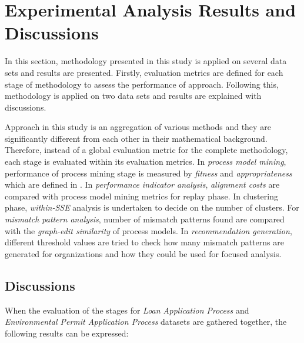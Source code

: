 \section{Experimental Analysis Results and Discussions}
\label{sec:results-and-discussions}

In this section, methodology presented in this study is applied on several data sets and results are presented. Firstly, evaluation metrics are defined for each stage of methodology to assess the performance of approach. Following this, methodology is applied on two data sets and results are explained with discussions.

Approach in this study is an aggregation of various methods and they are significantly different from each other in their mathematical background. Therefore, instead of a global evaluation metric for the complete methodology, each stage is evaluated within its evaluation metrics. In \textit{process model mining}, performance of process mining stage is measured by \textit{fitness} and \textit{appropriateness} which are defined in \cite{rozinat2008conformance}. In \textit{performance indicator analysis}, \textit{alignment costs} \cite{van2012replaying} are compared with process model mining metrics for replay phase. In clustering phase, \textit{within-SSE} analysis is undertaken to decide on the number of clusters. For \textit{mismatch pattern analysis}, number of mismatch patterns found are compared with the \textit{graph-edit similarity} \cite{dijkman2011similarity} of process models. In \textit{recommendation generation}, different threshold values are tried to check how many mismatch patterns are generated for organizations and how they could be used for focused analysis.




\subsection{Discussions}
\label{subsec:discussions}
When the evaluation of the stages for \textit{Loan Application Process} and \textit{Environmental Permit Application Process} datasets are gathered together, the following results can be expressed:

